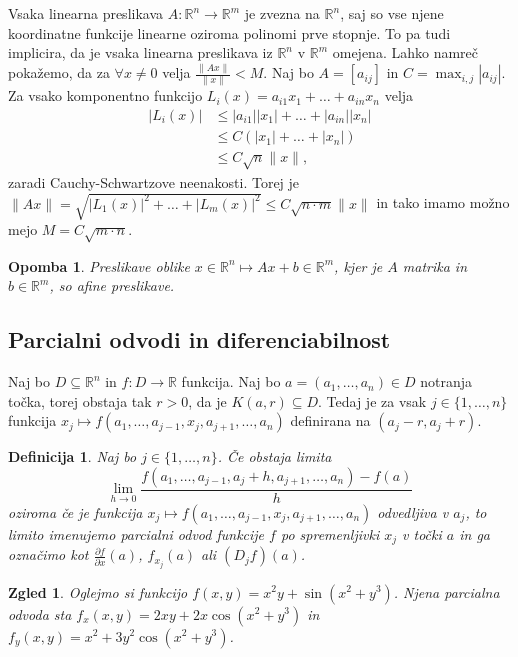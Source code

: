 \documentclass[10pt, a4paper]{article}
\newtheorem{defi}{Definicija}[section]
\newenvironment{noticeB}{%
  \tcolorbox[%
  notitle,
  empty,
  enhanced,  %
  breakable,
  coltext=black,
  colback=white, 
  fontupper=\rmfamily,
  parbox=false,
  noparskip,
  sharp corners,
  boxrule=-1pt,  %
  frame hidden,
  left=7pt,  %
  right=7pt,
  top=5pt,
  bottom=5pt,
  before skip=2.5ex plus 2pt,
  after skip=2.5ex plus 2pt,
  borderline west = {1.5pt}{-0.1pt}{blue!30!black}, %
  overlay unbroken and last={%
    \draw[color=black, line width=1.25pt]
    ($(frame.south west)+(1.pt, -0.1pt)$) -- ++(2em, 0);
  }
  ]}
{\endtcolorbox}
\newenvironment{definicija}{\begin{defi}\begin{noticeB}}{%
    \end{noticeB}\end{defi}}
\newtheorem*{opomba}{Opomba}
\newtheorem{zgled}{Zgled}[section]
\newcommand{\R}{\mathbb {R}}
\begin{document}
Vsaka linearna preslikava $A: \R^n \rightarrow \R^m$ je zvezna na $\R^n$,
saj so vse njene koordinatne funkcije linearne oziroma polinomi prve stopnje.
To pa tudi implicira, da je vsaka linearna preslikava iz $\R^n$ v $\R^m$ omejena.
Lahko namreč pokažemo, da za $\forall x \neq 0$ velja $\frac{\|Ax\|}{\|x\|} < M$.
Naj bo $A = [a_{ij}]$ in $C = \max_{i, j} |a_{ij}|$.
Za vsako komponentno funkcijo $L_i (x) = a_{i1} x_1 + \dots + a_{in} x_n$ velja 
\begin{align*}
    |L_i (x)| &\leq |a_{i1}| |x_1| + \dots + |a_{in}| |x_n|\\
    &\leq C (|x_1| + \dots + |x_n|)\\
    &\leq C \sqrt{n} \|x\|,
\end{align*}
zaradi Cauchy-Schwartzove neenakosti.
Torej je $\|Ax\| = \sqrt{|L_1 (x)|^2 + \dots + |L_m (x)|^2} \leq C \sqrt{n \cdot m} \|x\|$
in tako imamo možno mejo $M = C \sqrt{m \cdot n}$.

\begin{opomba}
    Preslikave oblike $x \in \R^n \mapsto Ax + b \in \R^m$, kjer je $A$ matrika in $b \in \R^m$,
    so afine preslikave.
\end{opomba}

\subsection{Parcialni odvodi in diferenciabilnost}

Naj bo $D \subseteq \R^n$ in $f: D \rightarrow \R$ funkcija.
Naj bo $a = (a_1, \dots, a_n) \in D$ notranja točka, torej obstaja tak $r > 0$, da je 
$K(a, r) \subseteq D$. Tedaj je za vsak $j \in \{1, \dots, n\}$ funkcija 
$x_j \mapsto f(a_1, \dots, a_{j-1}, x_j, a_{j + 1}, \dots, a_n)$
definirana na $(a_j - r, a_j + r)$.

\begin{definicija}
    Naj bo $j \in \{1, \dots, n\}$. Če obstaja limita 
    $$\lim_{h \to 0} {\frac{f(a_1, \dots, a_{j-1}, a_j + h, a_{j+1}, \dots, a_n) - f(a)}{h}}$$
    oziroma če je funkcija $x_j \mapsto f(a_1, \dots, a_{j-1}, x_j, a_{j+1}, \dots, a_n)$
    odvedljiva v $a_j$, to limito imenujemo parcialni odvod funkcije $f$ po spremenljivki 
    $x_j$ v točki $a$ in ga označimo kot $\frac{\partial f}{\partial x} (a)$,
    $f_{x_j} (a)$ ali $(D_j f) (a)$.
\end{definicija}

\begin{zgled}
    Oglejmo si funkcijo $f(x, y) = x^2 y + \sin (x^2 + y^3)$.
    Njena parcialna odvoda sta $f_x (x, y) = 2 xy + 2x \cos (x^2 + y^3)$
    in $f_y (x, y) = x^2 + 3y^2 \cos (x^2 + y^3)$.
\end{zgled}
\end{document}
